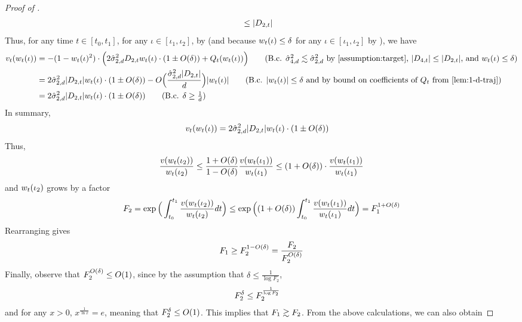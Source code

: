 \begin{proof}[Proof of ]
\begin{align}
& \leq |{D_{2, t}}|
\end{align}
Thus, for any time $t \in [t_0, t_1]$, for any $\iota \in [\iota_1, \iota_2]$, by  (and because $w_t(\iota) \leq \delta$ for any $\iota \in [\iota_1, \iota_2]$ by ), we have
\begin{align}
v_t(\w_t(\iota))
& = -(1 - \w_t(\iota)^2) \cdot \Big(2 \sigmaCoeffTwo^2 \DtwoT \w_t(\iota) \cdot (1 \pm O(\delta)) + Q_t(\w_t(\iota)) \Big) 
\tag{B.c. $\sigmaCoeffFour^2 \lesssim \sigmaCoeffTwo^2$ by \Cref{assumption:target}, $|D_{4, t}| \leq |D_{2, t}|$, and $\w_t(\iota) \leq \delta$} \\
& = 2 \sigmaCoeffTwo^2 |\DtwoT| \w_t(\iota) \cdot (1 \pm O(\delta)) - O\Big(\frac{\sigmaCoeffTwo^2 |D_{2, t}|}{d}\Big) |\w_t(\iota)|
\tag{B.c. $|\w_t(\iota)| \leq \delta$ and by bound on coefficients of $Q_t$ from \Cref{lem:1-d-traj}} \\
& = 2 \sigmaCoeffTwo^2 |\DtwoT| \w_t(\iota) \cdot (1 \pm O(\delta))
\tag{B.c. $\delta \geq \frac{1}{d}$}
\end{align}
In summary,
\begin{align}\label{eq:velocity_similar}
v_t(w_t(\iota))
& = 2 \hat{\sigma}_{2, d}^2 |D_{2, t}| w_t(\iota) \cdot (1 \pm O(\delta)) 
\end{align}
Thus,
\begin{align}
\frac{v(w_t(\iota_2))}{w_t(\iota_2)} \leq \frac{1 + O(\delta)}{1 - O(\delta)} \frac{v(w_t(\iota_1))}{w_t(\iota_1)} \leq (1 + O(\delta)) \cdot \frac{v(w_t(\iota_1))}{w_t(\iota_1)}
\end{align}
and $w_t(\iota_2)$ grows by a factor
\begin{align}
F_2 = \exp\Big(\int_{t_0}^{t_1} \frac{v(w_t(\iota_2))}{w_t(\iota_2)} dt \Big) \leq \exp\Big( (1 + O(\delta)) \int_{t_0}^{t_1} \frac{v(w_t(\iota_1))}{w_t(\iota_1)} dt \Big) = F_1^{1 + O(\delta)}
\end{align}
Rearranging gives
\begin{align}
F_1 \geq F_2^{1 - O(\delta)} = \frac{F_2}{F_2^{O(\delta)}}
\end{align}
Finally, observe that $F_2^{O(\delta)} \leq O(1)$, since by the assumption that $\delta \leq \frac{1}{\log F_2}$,
\begin{align} \label{eq:fu_power_delta}
F_2^{\delta}
& \leq F_2^{\frac{1}{\log F_2}}
\end{align}
and for any $x > 0$, $x^{\frac{1}{\ln x}} = e$, meaning that $F_2^{\delta} \leq O(1)$. This implies that $F_1 \gtrsim F_2$. From the above calculations, we can also obtain

\end{proof}
